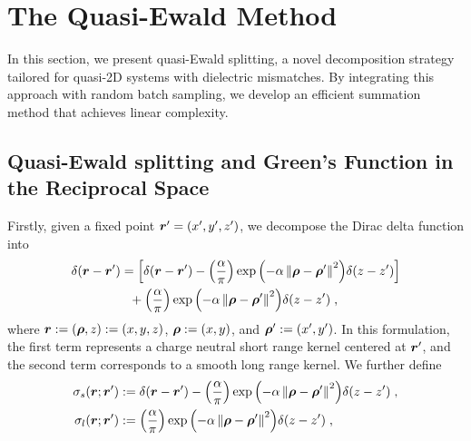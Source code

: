 \section{The Quasi-Ewald Method}

In this section, we present quasi-Ewald splitting, a novel decomposition strategy tailored for quasi-2D systems with dielectric mismatches. By integrating this approach with random batch sampling, we develop an efficient summation method that achieves linear complexity.
\subsection{Quasi-Ewald splitting and Green's Function in the Reciprocal Space}
Firstly, given a fixed point  $\boldsymbol{r}^\prime=(x^{\prime}, y^{\prime},z^{\prime})$, we decompose   the Dirac delta function into
\begin{equation}\label{eq...text...Quasi-EwaldMethod...QuasiEwaldSplitting}
\begin{aligned}
    \delta(\boldsymbol{r}-\boldsymbol{r}^\prime) &= \left[\delta (\boldsymbol{r}-\boldsymbol{r}^\prime) - {\left( \frac{\alpha}{\pi} \right)} \exp{\left(-\alpha \left\lVert\bm{\rho}-\bm{\rho}^\prime\right\rVert^2\right)} \delta(z-z^\prime) \right]\\&~~ + {\left( \frac{\alpha}{\pi} \right)} \exp{\left(-\alpha \left\lVert\bm{\rho}-\bm{\rho}^\prime\right\rVert^2\right)} \delta(z-z^\prime)\;,
    \end{aligned}
\end{equation}
where $\bm{r}:=(\bm{\rho}, z):=(x,y,z)$,   $\bm{\rho}:=(x,y)$, and $\bm{\rho}^\prime:=(x^\prime,y^\prime)$.
 In this formulation, the first term represents  a charge neutral short range kernel centered at $\bm{r}^\prime$, and the second term corresponds to a smooth long range kernel.  We further define  
\begin{equation}\label{eq...text...Kernels}
    \begin{split}
        \sigma_{s}(\boldsymbol{r}; \bm{r}^\prime) &:= \delta (\boldsymbol{r}-\boldsymbol{r}^\prime) - {\left( \frac{\alpha}{\pi} \right)} \exp{\left(-\alpha \left\lVert\bm{\rho}-\bm{\rho}^\prime\right\rVert^2\right)} \delta(z-z^\prime)\;,\\
        \sigma_{l}(\boldsymbol{r};\bm{r}^\prime) &:= {\left( \frac{\alpha}{\pi} \right)} \exp{\left(-\alpha \left\lVert\bm{\rho}-\bm{\rho}^\prime\right\rVert^2\right)} \delta(z-z^\prime)\;,
    \end{split}
\end{equation}
